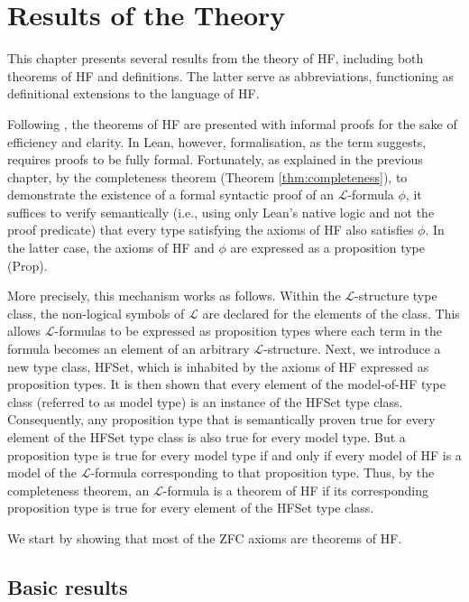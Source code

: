 \chapter{Results of the Theory}

This chapter presents several results from the theory of HF, 
including both theorems of HF and definitions. The latter serve as abbreviations, 
functioning as definitional extensions to the language of HF.

Following \cite{swierczkowski2003finite}, the theorems of HF are presented with informal proofs 
for the sake of efficiency and clarity. 
In Lean, however, formalisation, as the term suggests, requires proofs to be fully formal. 
Fortunately, as explained in the previous chapter, by the completeness theorem 
(Theorem \ref{thm:completeness}), to demonstrate the existence of a formal syntactic proof of 
an $\mathcal{L}$-formula $\phi$, 
it suffices to verify semantically 
(i.e., using only Lean's native logic and not the proof predicate) that 
every type satisfying the axioms of HF also satisfies $\phi$. 
In the latter case, the axioms of HF and $\phi$ are expressed as a proposition type 
({\ttfamily \small Prop}).


More precisely, this mechanism works as follows.
Within the $\mathcal{L}$-structure type class, the non-logical symbols of $\mathcal{L}$ are 
declared for the elements of the class. 
This allows $\mathcal{L}$-formulas to be expressed
as proposition types where each term in the formula becomes an element of an 
arbitrary $\mathcal{L}$-structure. Next, we introduce a new type class, {\ttfamily \small HFSet}, 
which is inhabited by the axioms of HF expressed as proposition types. 
It is then shown that every element of the model-of-HF type class 
(referred to as model type) is an instance of the {\ttfamily \small HFSet} type class.
Consequently, any proposition type that is semantically proven true for every element of 
the {\ttfamily \small HFSet} type class is also true for every model type.
But a proposition type is true for every model type if and only if 
every model of HF is a model of the $\mathcal{L}$-formula corresponding to that proposition type.
Thus, by the completeness theorem, an $\mathcal{L}$-formula is a theorem of HF if its corresponding 
proposition type is true for every element of the {\ttfamily \small HFSet} type class.

We start by showing that most of the ZFC axioms are theorems of HF.

\section{Basic results}


